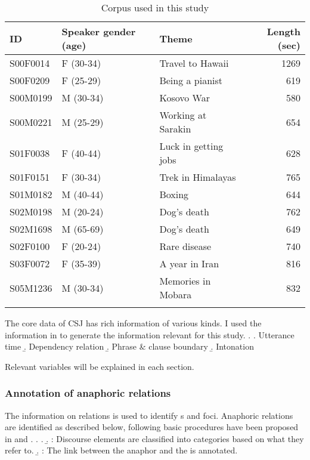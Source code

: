 \begin{table}
	\caption{Corpus used in this study}
	\label{CorpusInfoT}
	\begin{tabular}{lllr}
	\lsptoprule
	ID & Speaker gender (age) & Theme & Length (sec) \\
	\midrule
	S00F0014 & F (30-34) & Travel to Hawaii & 1269 \\
	S00F0209 & F (25-29) & Being a pianist & 619 \\
	S00M0199 & M (30-34) & Kosovo War & 580 \\
	S00M0221 & M (25-29) & Working at Sarakin & 654 \\
	S01F0038 & F (40-44) & Luck in getting jobs & 628 \\
	S01F0151 & F (30-34) & Trek in Himalayas & 765 \\
	S01M0182 & M (40-44) & Boxing & 644 \\
	S02M0198 & M (20-24) & Dog's death & 762 \\
	S02M1698 & M (65-69) & Dog's death & 649 \\
	S02F0100 & F (20-24) & Rare disease & 740 \\
	S03F0072 & F (35-39) & A year in Iran & 816 \\
	S05M1236 & M (30-34) & Memories in Mobara & 832 \\
	\lspbottomrule
	\end{tabular}
\end{table}

The core data of CSJ has rich information of various kinds.
I used the information in \Next to generate the information relevant for this study.
%
\ex.
 \a. Utterance time
 \b. Dependency relation
 \b. Phrase \& clause boundary
 \b. Intonation

Relevant variables will be explained in each section.

\subsubsection{Annotation of anaphoric relations}\label{FW:Cor:AnaRel}
\largerpage
The information on  relations is used
to identify s and foci.
An\-a\-phor\-ic relations are identified as described below, following basic procedures have been proposed in  and .
\ex.\label{AnnotationProcedure} 
	\a. 
	\b. : Discourse elements are classified into categories based on what they refer to.
	\b. :
		The link between the anaphor and the  is annotated.


